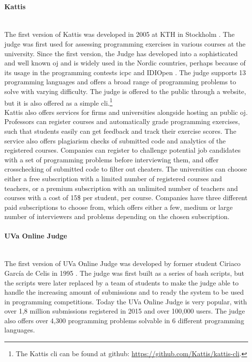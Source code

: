 \paragraph*{Kattis} \hfill \\
The first version of Kattis was developed in 2005 at KTH in Stockholm \cite{a:Enstrom2011}. The judge was first used for assessing programming exercises in various courses at the university. Since the first version, the Judge has developed into a sophisticated and well known \gls{oj} and is widely used in the Nordic countries, perhaps because of its usage in the programming contests \gls{icpc} \cite{ICPC} and IDIOpen \cite{IDIOPEN}. The judge supports 13 programming languages and offers a broad range of programming problems to solve with varying difficulty. The judge is offered to the public through a website, but it is also offered as a simple \gls{cli}.\footnote{The Kattis \gls{cli} can be found at github: \url{https://github.com/Kattis/kattis-cli}.} \\

Kattis also offers services for firms and universities alongside hosting an public \gls{oj}. Professors can register courses and automatically grade programming exercises, such that students easily can get feedback and track their exercise scores. The service also offers plagiarism checks of submitted code and analytics of the registered courses. Companies can register to challenge potential job candidates with a set of programming problems before interviewing them, and offer crosschecking of submitted code to filter out cheaters. The universities can choose either a free subscription with a limited number of registered courses and teachers, or a premium subscription with an unlimited number of teachers and courses with a cost of 15\$ per student, per course. Companies have three different paid subscriptions to choose from, which offers either a few, medium or large number of interviewers and problems depending on the chosen subscription.

\paragraph*{UVa Online Judge} \hfill \\
The first version of UVa Online Judge \cite{UVA} was developed by former student Ciriaco García de Celis in 1995 \cite{a:Revilla2008}. The judge was first built as a series of bash scripts, but the scripts were later replaced by a team of students to make the judge able to handle the increasing amount of submissions and to ready the system to be used in programming competitions. Today the UVa Online Judge is very popular, with over 1,8 million submissions registered in 2015 and over 100,000 users. The judge also offers over 4,300 programming problems solvable in 6 different programming languages.

